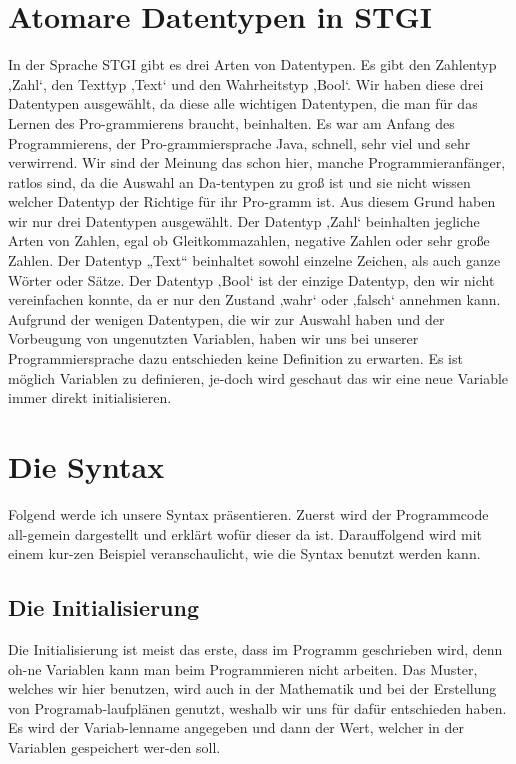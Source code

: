 \documentclass[a4paper, 12pt]{article}
\begin{document}
\section{Atomare Datentypen in STGI}
In der Sprache STGI gibt es drei Arten von Datentypen. Es gibt den Zahlentyp ‚Zahl‘, den Texttyp ‚Text‘ und den Wahrheitstyp ‚Bool‘. Wir haben diese drei Datentypen ausgewählt, da diese alle wichtigen Datentypen, die man für das Lernen des Pro-grammierens braucht, beinhalten. Es war am Anfang des Programmierens, der Pro-grammiersprache Java, schnell, sehr viel und sehr verwirrend. Wir sind der Meinung das schon hier, manche Programmieranfänger, ratlos sind, da die Auswahl an Da-tentypen zu groß ist und sie nicht wissen welcher Datentyp der Richtige für ihr Pro-gramm ist. 
Aus diesem Grund haben wir nur drei Datentypen ausgewählt. Der Datentyp ‚Zahl‘ beinhalten jegliche Arten von Zahlen, egal ob Gleitkommazahlen, negative Zahlen oder sehr große Zahlen. Der Datentyp „Text“ beinhaltet sowohl einzelne Zeichen, als auch ganze Wörter oder Sätze. Der Datentyp ‚Bool‘ ist der einzige Datentyp, den wir nicht vereinfachen konnte, da er nur den Zustand ‚wahr‘ oder ‚falsch‘ annehmen kann.
Aufgrund der wenigen Datentypen, die wir zur Auswahl haben und der Vorbeugung von ungenutzten Variablen, haben wir uns bei unserer Programmiersprache dazu entschieden keine Definition zu erwarten. Es ist möglich Variablen zu definieren, je-doch wird geschaut das wir eine neue Variable immer direkt initialisieren.

\section{Die Syntax}
Folgend werde ich unsere Syntax präsentieren. Zuerst wird der Programmcode all-gemein dargestellt und erklärt wofür dieser da ist. Darauffolgend wird mit einem kur-zen Beispiel veranschaulicht, wie die Syntax benutzt werden kann. 

\subsection{Die Initialisierung}
Die Initialisierung ist meist das erste, dass im Programm geschrieben wird, denn oh-ne Variablen kann man beim Programmieren nicht arbeiten. Das Muster, welches wir hier benutzen, wird auch in der Mathematik und bei der Erstellung von Programab-laufplänen genutzt, weshalb wir uns für dafür entschieden haben. Es wird der Variab-lenname angegeben und dann der Wert, welcher in der Variablen gespeichert wer-den soll.
\end{document}
